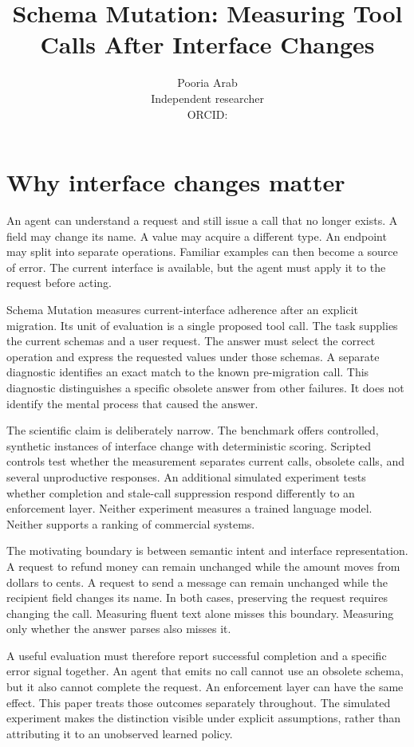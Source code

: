 \documentclass{article}
\title{Schema Mutation: Measuring Tool Calls After Interface Changes}
\author{Pooria Arab\\Independent researcher\\ORCID: \AuthorOrcid}
\begin{document}
\maketitle
\begin{abstract}\end{abstract}
\section{Why interface changes matter}
An agent can understand a request and still issue a call that no longer exists. A field may change its name. A value may acquire a different type. An endpoint may split into separate operations. Familiar examples can then become a source of error. The current interface is available, but the agent must apply it to the request before acting.\par
Schema Mutation measures current-interface adherence after an explicit migration. Its unit of evaluation is a single proposed tool call. The task supplies the current schemas and a user request. The answer must select the correct operation and express the requested values under those schemas. A separate diagnostic identifies an exact match to the known pre-migration call. This diagnostic distinguishes a specific obsolete answer from other failures. It does not identify the mental process that caused the answer.\par
The scientific claim is deliberately narrow. The benchmark offers controlled, synthetic instances of interface change with deterministic scoring. Scripted controls test whether the measurement separates current calls, obsolete calls, and several unproductive responses. An additional simulated experiment tests whether completion and stale-call suppression respond differently to an enforcement layer. Neither experiment measures a trained language model. Neither supports a ranking of commercial systems.\par
The motivating boundary is between semantic intent and interface representation. A request to refund money can remain unchanged while the amount moves from dollars to cents. A request to send a message can remain unchanged while the recipient field changes its name. In both cases, preserving the request requires changing the call. Measuring fluent text alone misses this boundary. Measuring only whether the answer parses also misses it.\par
A useful evaluation must therefore report successful completion and a specific error signal together. An agent that emits no call cannot use an obsolete schema, but it also cannot complete the request. An enforcement layer can have the same effect. This paper treats those outcomes separately throughout. The simulated experiment makes the distinction visible under explicit assumptions, rather than attributing it to an unobserved learned policy.\par
\end{document}
